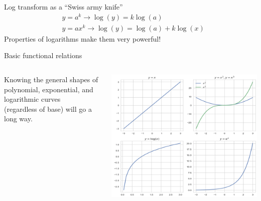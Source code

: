 \documentclass[aspectratio=169]{../latex_main/tntbeamer}  %
\begin{document}
	
	
	\begin{frame}{Log transform as a “Swiss army knife”}
	    \begin{align*}
	        &y = a^k \rightarrow \log (y) = k\log (a)\\
	        &y = ax^k \rightarrow \log (y) = \log (a) + k\log (x)
	    \end{align*}
	    Properties of logarithms make them very powerful!
	\end{frame}
	
	
	
	\begin{frame}{Basic functional relations}
	    \begin{columns}
	        \begin{column}{.5\textwidth}

	               Knowing the general shapes of polynomial, exponential, and logarithmic curves\\ (regardless of base) will go a long way.
	               
	        \end{column}
	        
	        
	        \begin{column}{.5\textwidth}
	        
	                   \centering
	                   \includegraphics[scale=.35]{Bild98}

	        \end{column}
	    \end{columns}
	\end{frame}
	
\end{document}
